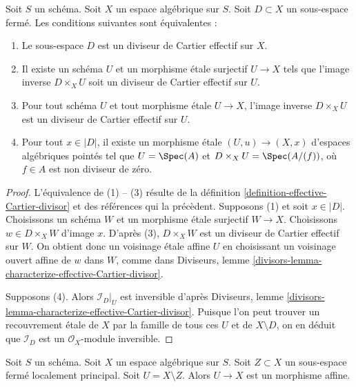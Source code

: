 \begin{lemma}
\label{lemma-characterize-effective-Cartier-divisor}
Soit $S$ un schéma. Soit $X$ un espace algébrique sur $S$.
Soit $D \subset X$ un sous-espace fermé.
Les conditions suivantes sont équivalentes :
\begin{enumerate}
\item Le sous-espace $D$ est un diviseur de Cartier effectif sur $X$.
\item Il existe un schéma $U$ et un morphisme \'etale surjectif $U \to X$ tels que
l'image inverse $D \times_X U$ soit un diviseur de Cartier effectif sur $U$.
\item Pour tout schéma $U$ et tout morphisme \'etale $U \to X$,
l'image inverse $D \times_X U$ est un diviseur de Cartier effectif sur $U$.
\item Pour tout $x \in |D|$, il existe un morphisme \'etale
$(U, u) \to (X, x)$ d'espaces algébriques pointés tel que $U = \Spec(A)$
et $D \times_X U = \Spec(A/(f))$, où $f \in A$ est non diviseur de zéro.
\end{enumerate}
\end{lemma}

\begin{proof}
L'équivalence de (1) -- (3) résulte de la
définition \ref{definition-effective-Cartier-divisor}
et des références qui la précèdent.
Supposons (1) et soit $x \in |D|$. Choisissons un schéma $W$ et un
morphisme \'etale surjectif
$W \to X$. Choisissons $w \in D \times_X W$ d'image $x$.
D'après (3), $D \times_X W$ est un diviseur de Cartier
effectif sur $W$. On obtient donc un voisinage \'etale affine $U$
en choisissant un voisinage ouvert affine de $w$ dans $W$, comme dans
Diviseurs, lemme \ref{divisors-lemma-characterize-effective-Cartier-divisor}.

\medskip\noindent
Supposons (4). Alors $\mathcal{I}_D|_U$ est inversible d'après
Diviseurs, lemme \ref{divisors-lemma-characterize-effective-Cartier-divisor}.
Puisque l'on peut trouver un recouvrement \'etale de $X$ par la famille
de tous ces $U$ et de $X \setminus D$, on en déduit que
$\mathcal{I}_D$ est un $\mathcal{O}_X$-module inversible.
\end{proof}

\begin{lemma}
\label{lemma-complement-locally-principal-closed-subscheme}
Soit $S$ un schéma. Soit $X$ un espace algébrique sur $S$.
Soit $Z \subset X$ un sous-espace fermé localement
principal. Soit $U = X \setminus Z$. Alors $U \to X$ est un morphisme affine.
\end{lemma}

